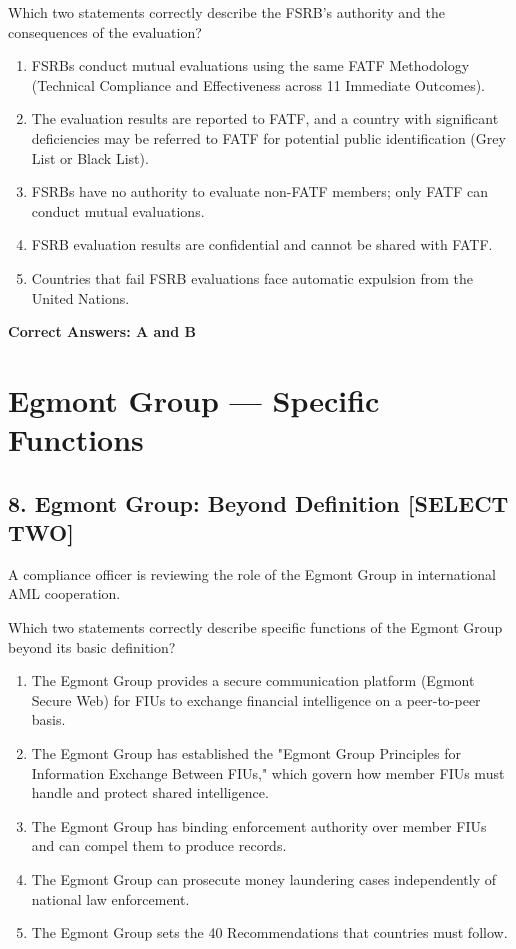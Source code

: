 \documentclass[11pt,a4paper]{article}
\begin{document}
	Which two statements correctly describe the FSRB's authority and the consequences of the evaluation?
	
	\begin{enumerate}[label=\Alph*.]
		\item FSRBs conduct mutual evaluations using the same FATF Methodology (Technical Compliance and Effectiveness across 11 Immediate Outcomes).
		\item The evaluation results are reported to FATF, and a country with significant deficiencies may be referred to FATF for potential public identification (Grey List or Black List).
		\item FSRBs have no authority to evaluate non-FATF members; only FATF can conduct mutual evaluations.
		\item FSRB evaluation results are confidential and cannot be shared with FATF.
		\item Countries that fail FSRB evaluations face automatic expulsion from the United Nations.
	\end{enumerate}
	
	\textbf{Correct Answers: A and B}
	
	\section{Egmont Group — Specific Functions}
	
	\subsection{8. Egmont Group: Beyond Definition \textnormal{[SELECT TWO]}}
	
	A compliance officer is reviewing the role of the Egmont Group in international AML cooperation.
	
	Which two statements correctly describe specific functions of the Egmont Group beyond its basic definition?
	
	\begin{enumerate}[label=\Alph*.]
		\item The Egmont Group provides a secure communication platform (Egmont Secure Web) for FIUs to exchange financial intelligence on a peer-to-peer basis.
		\item The Egmont Group has established the "Egmont Group Principles for Information Exchange Between FIUs," which govern how member FIUs must handle and protect shared intelligence.
		\item The Egmont Group has binding enforcement authority over member FIUs and can compel them to produce records.
		\item The Egmont Group can prosecute money laundering cases independently of national law enforcement.
		\item The Egmont Group sets the 40 Recommendations that countries must follow.
	\end{enumerate}
	
\end{document}
